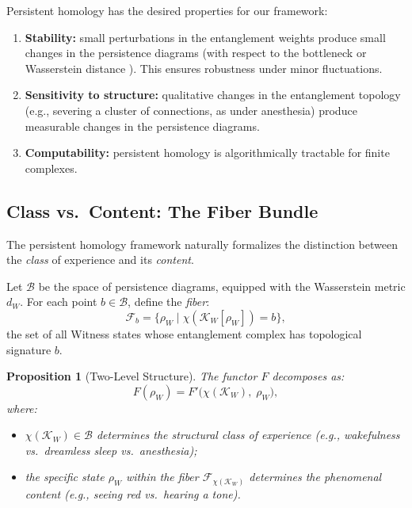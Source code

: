 \documentclass[12pt, a4paper]{article}
\newtheorem{proposition}{Proposition}
\begin{document}
Persistent homology has the desired properties for our framework:
\begin{enumerate}[label=(\roman*)]
    \item \textbf{Stability:} small perturbations in the entanglement weights produce small changes in the persistence diagrams (with respect to the bottleneck or Wasserstein distance \cite{CohenSteiner2007}). This ensures robustness under minor fluctuations.
    \item \textbf{Sensitivity to structure:} qualitative changes in the entanglement topology (e.g., severing a cluster of connections, as under anesthesia) produce measurable changes in the persistence diagrams.
    \item \textbf{Computability:} persistent homology is algorithmically tractable for finite complexes.
\end{enumerate}

\subsection{Class vs.\ Content: The Fiber Bundle}

The persistent homology framework naturally formalizes the distinction between the \emph{class} of experience and its \emph{content}.

Let $\mathcal{B}$ be the space of persistence diagrams, equipped with the Wasserstein metric $d_W$. For each point $b \in \mathcal{B}$, define the \emph{fiber}:
\begin{equation}
\mathcal{F}_b = \bigl\{ \rho_W \;\big|\; \chi(\mathcal{K}_W[\rho_W]) = b \bigr\},
\label{eq:fiber}
\end{equation}
the set of all Witness states whose entanglement complex has topological signature $b$.

\begin{proposition}[Two-Level Structure]
The functor $F$ decomposes as:
\begin{equation}
F(\rho_W) = F'\!\bigl(\chi(\mathcal{K}_W),\; \rho_W\bigr),
\label{eq:twolevel}
\end{equation}
where:
\begin{itemize}
    \item $\chi(\mathcal{K}_W) \in \mathcal{B}$ determines the \emph{structural class} of experience (e.g., wakefulness vs.\ dreamless sleep vs.\ anesthesia);
    \item the specific state $\rho_W$ within the fiber $\mathcal{F}_{\chi(\mathcal{K}_W)}$ determines the \emph{phenomenal content} (e.g., seeing red vs.\ hearing a tone).
\end{itemize}
\end{proposition}
\end{document}
